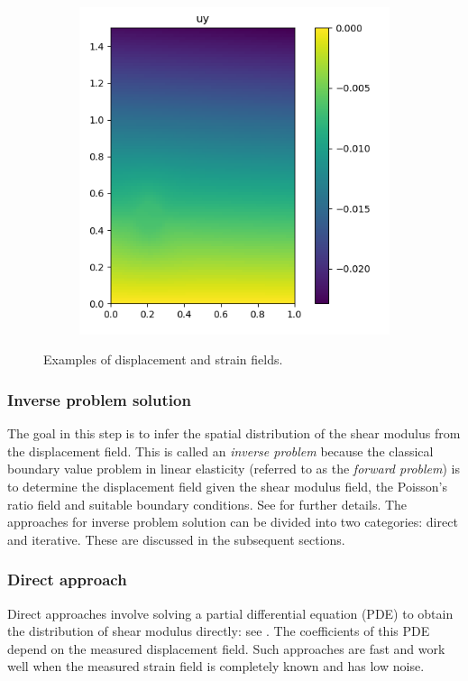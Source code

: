 \documentclass[12pt]{article}
\begin{document}
\begin{figure}[h]
\begin{subfigure}[c]{0.25\linewidth}
  \end{subfigure}
  \begin{subfigure}[c]{0.25\linewidth}
    \includegraphics[totalheight=4cm]{Figures/dispstrainfields/uy11_fypy.png}
  \end{subfigure}
  \caption{\label{fig:exampdispstrain} Examples of displacement and strain fields.}
\end{figure}
\subsubsection{Inverse problem solution} The goal in this step is to infer the spatial distribution of the shear modulus from the displacement field. This is called an \textit{inverse problem} because the classical boundary value problem in linear elasticity (referred to as the \textit{forward problem}) is to determine the displacement field given the shear modulus field, the Poisson's ratio field and suitable boundary conditions. See \cite{book:hugheslinear,book:fishbelytschko} for further details. The approaches for inverse problem solution can be divided into two categories: direct and iterative. These are discussed in the subsequent sections.
\subsubsection{Direct approach} Direct approaches involve solving a partial differential equation (PDE) to obtain the distribution of shear modulus directly: see \cite{paper:raghavan1994,paper:barboneadjwt,paper:albocher}. The coefficients of this PDE depend on the measured displacement field. Such approaches are fast and work well when the measured strain field is completely known and has low noise.
\end{document}
